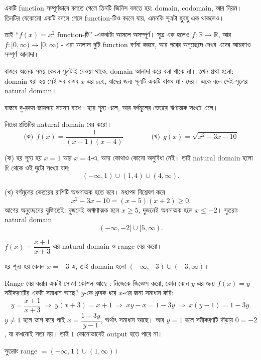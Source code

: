 \documentclass[11pt]{article}
\begin{document}
\begin{idea}
একটি function সম্পূর্ণভাবে বলতে গেলে তিনটি জিনিস বলতে হয়: domain, codomain,
আর নিয়ম। তিনটির যেকোনো একটি বদলে গেলে function-টিও বদলে যায়, এমনকি সূত্রটা
হুবহু এক থাকলেও।

তাই ``$f(x) = x^2$ function-টি'' -একথাটা আসলে অসম্পূর্ণ। সূত্র এক হলেও $f \colon \mathbb{R} \to
\mathbb{R}$, আর $f \colon [0,\infty) \to [0,\infty)$ - এরা
আলাদা দুটি function বর্ণনা করবে, আর পরের অনুচ্ছেদে দেখব এদের আচরণও সম্পূর্ণ আলাদা।
\end{idea}

\begin{idea}[স্বাভাবিক ডোমেইন]
বাস্তবে অনেক সময় কেবল সূত্রটাই দেওয়া থাকে, domain আলাদা করে বলা থাকে না।
তখন প্রথা হলো: domain ধরা হয় সেই সব বাস্তব $x$-এর set, যাদের জন্য সূত্রটি
একটি বাস্তব মান দেয়। একে বলে সেই সূত্রের natural domain।

বাস্তবে দু-রকম জায়গায় সমস্যা বাধে : হরে শূন্য এলে, আর বর্গমূলের ভেতরে
ঋণাত্মক সংখ্যা এলে।
\end{idea}

\begin{example}
নিচের প্রতিটির natural domain বের করো।
\[
  \text{(ক)}\ \ f(x) = \frac{1}{(x-1)(x-4)}
  \qquad\qquad
  \text{(খ)}\ \ g(x) = \sqrt{x^2 - 3x - 10}
\]
\end{example}

\begin{solbox}
(ক) হর শূন্য হয় $x = 1$ আর $x = 4$-এ, অন্য কোথাও কোনো অসুবিধা নেই। তাই
natural domain হলো $\mathbb{R}$ থেকে ওই দুটো সংখ্যা বাদ:
\[
  (-\infty, 1) \cup (1, 4) \cup (4, \infty).
\]

(খ) বর্গমূলের ভেতরের রাশিটি অঋণাত্মক হতে হবে। মধ্যপদ বিশ্লেষণ করে
\[
  x^2 - 3x - 10 = (x - 5)(x + 2) \geq 0.
\]
আগের অনুচ্ছেদের যুক্তিতেই: দুজনেই অঋণাত্মক হলে $x \geq 5$, দুজনেই অধনাত্মক
হলে $x \leq -2$। সুতরাং natural domain
\[
  (-\infty, -2] \cup [5, \infty).
\]
\end{solbox}

\begin{example}
$f(x) = \dfrac{x+1}{x+3}$-এর natural domain ও range বের করো।
\end{example}

\begin{solbox}
হর শূন্য হয় কেবল $x = -3$-এ, তাই domain হলো
$(-\infty, -3) \cup (-3, \infty)$।

Range বের করার একটা সোজা কৌশল আছে : নিজেকে জিজ্ঞেস করো, কোন কোন $y$-এর জন্য
$f(x) = y$ সমীকরণটির একটা সমাধান আছে? $y$-কে ধ্রুবক ধরে $x$-এর জন্য সমাধান
করি:
\[
  y = \frac{x+1}{x+3}
  \ \Longrightarrow\ y(x + 3) = x + 1
  \ \Longrightarrow\ xy - x = 1 - 3y
  \ \Longrightarrow\ x(y - 1) = 1 - 3y .
\]
$y \neq 1$ হলে ভাগ করে পাই $x = \dfrac{1 - 3y}{y - 1}$, অর্থাৎ সমাধান আছে।
আর $y = 1$ হলে সমীকরণটি দাঁড়ায় $0 = -2$, যা কখনোই সত্য নয়। তাই $1$
কোনোভাবেই output হতে পারে না।

সুতরাং range $= (-\infty, 1) \cup (1, \infty)$।
\end{solbox}
\end{document}
